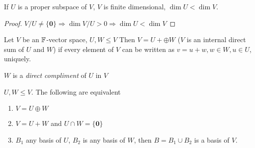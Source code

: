\documentclass[a4paper]{article}
\begin{document}
\begin{cor} 
	If $ U $ is a proper subspace of $ V $, $ V $ is finite dimensional, $ \dim U < \dim V $.
	
	\begin{proof}
		$ V / U \neq \{ \mathbf{0} \} \Rightarrow \dim V/U  > 0 \Rightarrow \dim U < \dim V$
	\end{proof}
\end{cor}

\begin{defi}
	Let $ V $ be an $ \mathbb{F} $-vector space, $ U,W \leq V $
	Then $ V = U + \oplus W $ ($ V $ is an internal direct sum of $ U $ and $ W $) if every element of $ V $ can be written as $ v  = u + w, w \in W, u \in U $, uniquely.
	
	$ W $ is a \emph{direct compliment} of $ U $ in $ V $
\end{defi}

\begin{lemma} 
	$ U,W \leq V $. The following are equivalent
	
	\begin{enumerate}
		\item $ V = U \oplus W $
		\item $ V = U + W $ and $ U \cap W = \{ \mathbf{0} \} $
		\item $ B_{1} $ any basis of $ U $, $ B_{2} $ is any basis of $ W $, then $ B = B_{1} \cup B_{2} $ is a basis of $ V $.
		
	\end{enumerate}
\end{lemma}
\end{document}
